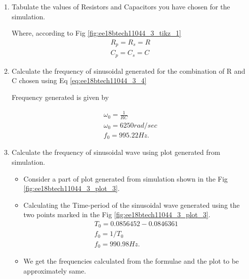 \begin{enumerate}[label=\thesubsection.\arabic*.,ref=\thesubsection.\theenumi]
\item Tabulate the values of Resistors and Capacitors you have chosen for the simulation.

\solution

\begin{table}[!ht]
\centering

\caption{}
\label{table:ee18btech11044_t_1}
\end{table}

Where, according to Fig \ref{fig:ee18btech11044_3_tikz_1}
\begin{align}
    R_p = R_s = R \\
    C_p = C_s = C
\end{align}
 
 \item Calculate the frequency of sinusoidal generated for the combination of R and C chosen using Eq \ref{eq:ee18btech11044_3_4}
 
 \solution
 
 Frequency generated is given by 
 
 \begin{align}
     \omega_{0} = \frac{1}{ R C} \\
     \omega_{0} = 6250 rad/sec \\
     f_{0} = 995.22Hz.
 \end{align}
 
 \item Calculate the frequency of sinusoidal wave using plot generated from simulation.
 
 \solution
 \begin{itemize}
     \item Consider a part of plot generated from simulation shown in the Fig \ref{fig:ee18btech11044_3_plot_3}.
     \item Calculating the Time-period of the sinusoidal wave generated using the two points marked in the Fig \ref{fig:ee18btech11044_3_plot_3}.
     \begin{align}
         T_0 = 0.0856452 - 0.0846361 \\
         f_0 = 1/T_0 \\
         f_0 = 990.98Hz.
     \end{align}
     \item We get the frequencies calculated from the formulae and the plot to be approximately same.
 \end{itemize}
 

\end{enumerate}
